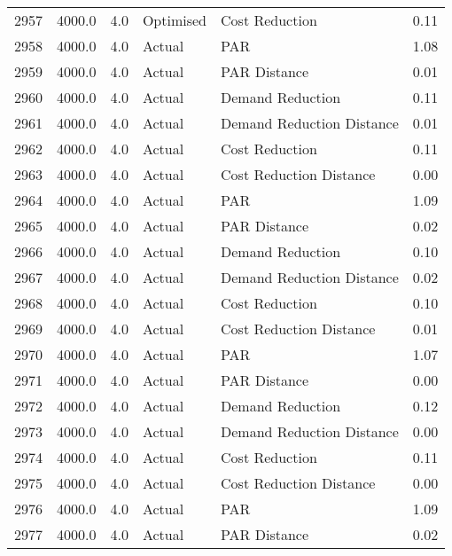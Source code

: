 \begin{longtable}{lrrllr}
2957 &       4000.0 &     4.0 &      Optimised &             Cost Reduction &   0.11 \\
2958 &       4000.0 &     4.0 &         Actual &                        PAR &   1.08 \\
2959 &       4000.0 &     4.0 &         Actual &               PAR Distance &   0.01 \\
2960 &       4000.0 &     4.0 &         Actual &           Demand Reduction &   0.11 \\
2961 &       4000.0 &     4.0 &         Actual &  Demand Reduction Distance &   0.01 \\
2962 &       4000.0 &     4.0 &         Actual &             Cost Reduction &   0.11 \\
2963 &       4000.0 &     4.0 &         Actual &    Cost Reduction Distance &   0.00 \\
2964 &       4000.0 &     4.0 &         Actual &                        PAR &   1.09 \\
2965 &       4000.0 &     4.0 &         Actual &               PAR Distance &   0.02 \\
2966 &       4000.0 &     4.0 &         Actual &           Demand Reduction &   0.10 \\
2967 &       4000.0 &     4.0 &         Actual &  Demand Reduction Distance &   0.02 \\
2968 &       4000.0 &     4.0 &         Actual &             Cost Reduction &   0.10 \\
2969 &       4000.0 &     4.0 &         Actual &    Cost Reduction Distance &   0.01 \\
2970 &       4000.0 &     4.0 &         Actual &                        PAR &   1.07 \\
2971 &       4000.0 &     4.0 &         Actual &               PAR Distance &   0.00 \\
2972 &       4000.0 &     4.0 &         Actual &           Demand Reduction &   0.12 \\
2973 &       4000.0 &     4.0 &         Actual &  Demand Reduction Distance &   0.00 \\
2974 &       4000.0 &     4.0 &         Actual &             Cost Reduction &   0.11 \\
2975 &       4000.0 &     4.0 &         Actual &    Cost Reduction Distance &   0.00 \\
2976 &       4000.0 &     4.0 &         Actual &                        PAR &   1.09 \\
2977 &       4000.0 &     4.0 &         Actual &               PAR Distance &   0.02 \\

\end{longtable}
